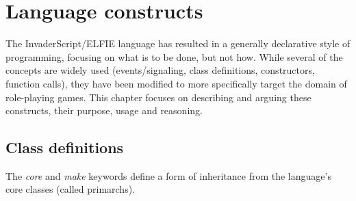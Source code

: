\section{Language constructs}
The InvaderScript/ELFIE language has resulted in a generally declarative style of programming, focusing on what is to be done, but not how. While several of the concepts are widely used (events/signaling, class definitions, constructors, function calls), they have been modified to more specifically target the domain of role-playing games. This chapter focuses on describing and arguing these constructs, their purpose, usage and reasoning.

\subsection{Class definitions}
The \emph{core} and \emph{make}  keywords define a form of inheritance from the language's core classes (called primarchs).
